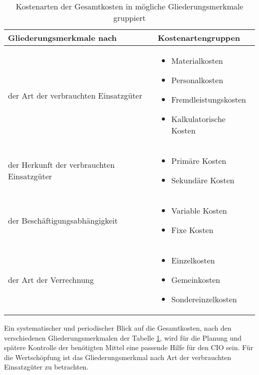 \begin{table}[h!]
\begin{tabularx}{\textwidth}{|X|X|}
	\hline \textbf{Gliederungsmerkmale nach} & \textbf{Kostenartengruppen} \\ 
	\hline der Art der verbrauchten Einsatzgüter & \begin{itemize}
		\item Materialkosten
		\item Personalkosten
		\item Fremdleistungskosten
		\item Kalkulatorische Kosten
	\end{itemize} \\ 
	\hline der Herkunft der verbrauchten Einsatzgüter & \begin{itemize}
		\item Primäre Kosten
		\item Sekundäre Kosten	
	\end{itemize}  \\ 
	\hline der Beschäftigungsabhängigkeit & \begin{itemize}
		\item Variable Kosten
		\item Fixe Kosten
	\end{itemize} \\ 
	\hline der Art der Verrechnung & \begin{itemize}
		\item Einzelkosten
		\item Gemeinkosten
		\item Sondereinzelkosten
	\end{itemize} \\ 
	\hline 
\end{tabularx}
	\caption{Kostenarten der Gesamtkosten in mögliche Gliederungsmerkmale gruppiert}
	\label{tab_gliederung_kostenarten}
\end{table}

Ein systematischer und periodischer Blick auf die Gesamtkosten, nach den verschiedenen Gliederungsmerkmalen der Tabelle \ref{tab_gliederung_kostenarten}, wird f\"ur die Planung und sp\"atere Kontrolle der ben\"otigten Mittel eine passende Hilfe f\"ur den CIO sein. Für die Wertschöpfung ist das Gliederungsmerkmal nach Art der verbrauchten Einsatzgüter zu betrachten.











